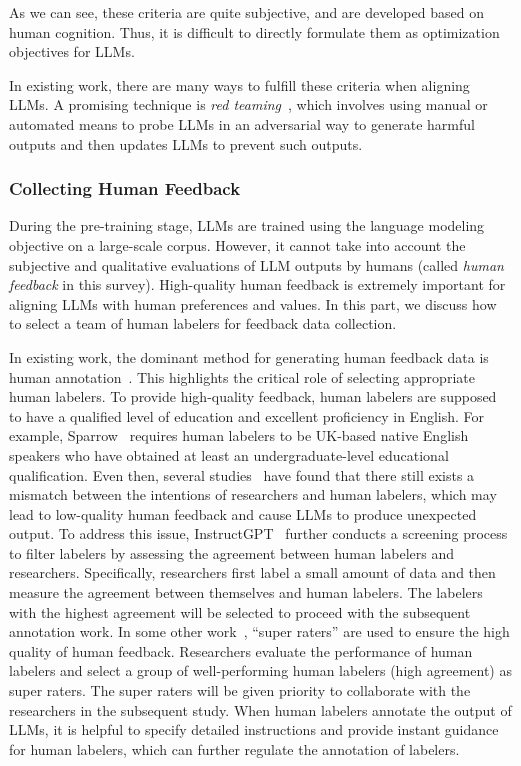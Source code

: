 As we can see, these criteria are quite subjective, and are developed based on human cognition. 
Thus, it is difficult to directly formulate them as optimization objectives for LLMs. 
{In existing work, there are many ways to fulfill these criteria when aligning LLMs. 
A promising technique is \emph{red teaming}~\cite{Perez-EMNLP-2022-Red}, which involves using manual or automated means to probe LLMs in an adversarial way to generate harmful outputs and then updates LLMs to prevent such outputs.

\subsubsection{Collecting Human Feedback}\label{sec-human-feedback}
During the pre-training stage, LLMs are trained using the language modeling objective on a large-scale corpus. However, it cannot take into account the subjective and qualitative evaluations of LLM outputs by humans (called \emph{human feedback} in this survey).
High-quality human feedback is extremely important for aligning LLMs with human preferences and values.
In this part, we discuss how to select a team of human labelers for  feedback data collection.  

In existing work, the dominant method for generating human feedback data is human annotation~\cite{Ziegler-arxiv-2019-Fine-Tuning,Ouyang-arxiv-2022-Training,Glaese-arxiv-2022-Improving}. This highlights the critical role of selecting appropriate human labelers.
To provide high-quality feedback, human labelers are supposed to have a qualified level of education and excellent proficiency in English. For example, Sparrow~\cite{Glaese-arxiv-2022-Improving} requires human labelers to be UK-based native English speakers who have obtained at least an undergraduate-level educational qualification.
Even then, several studies~\cite{Ziegler-arxiv-2019-Fine-Tuning} have found that there still exists a mismatch between the intentions of researchers and human labelers, which may lead to low-quality human feedback and cause LLMs to produce unexpected output. 
To address this issue, %
InstructGPT~\cite{Ouyang-arxiv-2022-Training} further conducts a screening process to filter labelers by assessing the agreement between human labelers and researchers. Specifically, researchers first label a small amount of data and then measure the agreement between themselves and human labelers. The labelers with the highest agreement will be selected to proceed with the subsequent annotation work. 
In some other work~\cite{Menick-arxiv-2022-teaching},  ``super raters'' are used to ensure the high quality of human feedback. Researchers evaluate the performance of human labelers and select a group of well-performing human labelers (\eg high agreement) as super raters. The super raters will be given priority to collaborate with the researchers in the subsequent study. 
When human labelers annotate the output of LLMs, it is helpful to specify detailed instructions and provide instant guidance for human labelers, which can further regulate the annotation of labelers. 



}

